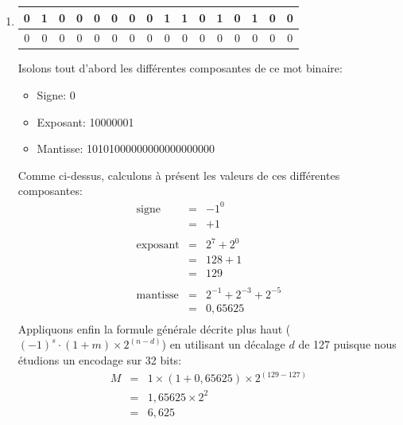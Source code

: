 \documentclass[12pt]{article}
\newenvironment{MaReponse}
		{\begin{greyedtextbox}\itshape} %
		{\end{greyedtextbox}}            %
\newenvironment{alphenum}
{\begin{enumerate}[label=\alph*.]}
	{\end{enumerate}}
\begin{document}
	\begin{MaReponse}
		\begin{alphenum}
			\item
			\begin{tabular}{|c|c|c|c|c|c|c|c|c|c|c|c|c|c|c|c|} %
				\hline
				0&1&0&0&0&0&0&0&1&1&0&1&0&1&0&0 \\
				\hline
				0&0&0&0&0&0&0&0&0&0&0&0&0&0&0&0 \\
				\hline
			\end{tabular}
			\par
			Isolons tout d'abord les différentes composantes de ce mot binaire:
			\begin{itemize}
				\item Signe: 0
				\item Exposant: 10000001
				\item Mantisse: 10101000000000000000000
			\end{itemize}
			Comme ci-dessus, calculons à présent les valeurs de ces différentes composantes:
			\[
			\begin{array}{lll}
				\text{signe} & \text{=} & -1^0\\
				& \text{=} & +1\\
				\\
				\text{exposant} & \text{=} & 2^7 + 2^0\\
				& \text{=} & 128 + 1\\
				& \text{=} & 129\\
				\\
				\text{mantisse} & \text{=} & 2^{-1} + 2^{-3} + 2^{-5}\\
				& \text{=} & 0,65625\\
			\end{array}
			\]
			Appliquons enfin la formule générale décrite plus haut ($(-1)^s\cdot (1+m) \times 2^{(n-d)}$) en utilisant un décalage $d$ de 127 puisque nous étudions un encodage sur 32 bits:
			\[
			\begin{array}{lll}
				M& \text{=} & 1 \times (1+0,65625) \times 2^{(129 - 127)}\\
				& \text{=} & 1,65625 \times 2^2\\
				& \text{=} & 6,625\
			\end{array}
			\]
			

\end{alphenum}
\end{MaReponse}
\end{document}
